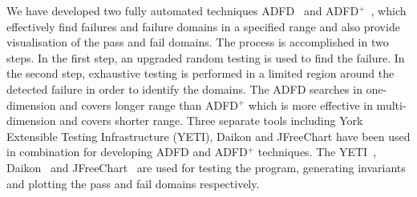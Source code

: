 \documentclass[runningheads,a4paper]{llncs}
\begin{document}

We have developed two fully automated techniques ADFD~\cite{ahmad2013adfd} and ADFD$^+$~\cite{ahmad2014adfd2}, which effectively find failures and failure domains in a specified range and also provide visualisation of the pass and fail domains. The process is accomplished in two steps. In the first step, an upgraded random testing is used to find the failure. In the second step, exhaustive testing is performed in a limited region around the detected failure in order to identify the domains. The ADFD searches in one-dimension and covers longer range than ADFD$^+$ which is more effective in multi-dimension and covers shorter range. Three separate tools including York Extensible Testing Infrastructure (YETI), Daikon and JFreeChart have been used in combination for developing ADFD and ADFD$^+$ techniques. The YETI~\cite{Oriol2011yeti}, Daikon~\cite{ernst2007daikon} and JFreeChart~\cite{gilbert2008jfreechart} are used for testing the program, generating invariants and plotting the pass and fail domains respectively.




\end{document}
